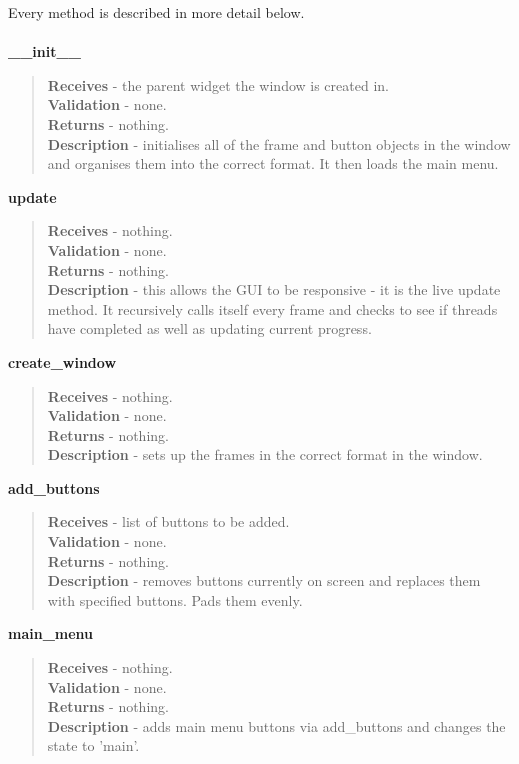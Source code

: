 \documentclass[titlepage]{article}
\begin{document}
Every method is described in more detail below. \\\\

\textbf{\_\_init\_\_}
\begin{quote}
\textbf{Receives} - the parent widget the window is created in. \\
\textbf{Validation} - none.\\
\textbf{Returns} - nothing. \\
\textbf{Description} - initialises all of the frame and button objects in the window and organises them into the correct format. It then loads the main menu.
\end{quote}

\textbf{update}
\begin{quote}
\textbf{Receives} - nothing. \\
\textbf{Validation} - none.\\
\textbf{Returns} - nothing. \\
\textbf{Description} - this allows the GUI to be responsive - it is the live update method. It recursively calls itself every frame and checks to see if threads have completed as well as updating current progress.
\end{quote}

\textbf{create\_window}
\begin{quote}
\textbf{Receives} - nothing. \\
\textbf{Validation} - none.\\
\textbf{Returns} - nothing. \\
\textbf{Description} - sets up the frames in the correct format in the window.
\end{quote}

\textbf{add\_buttons}
\begin{quote}
\textbf{Receives} - list of buttons to be added. \\
\textbf{Validation} - none.\\
\textbf{Returns} - nothing. \\
\textbf{Description} - removes buttons currently on screen and replaces them with specified buttons. Pads them evenly.
\end{quote}

\textbf{main\_menu}
\begin{quote}
\textbf{Receives} - nothing. \\
\textbf{Validation} - none.\\
\textbf{Returns} - nothing. \\
\textbf{Description} - adds main menu buttons via add\_buttons and changes the state to 'main'. 
\end{quote}
\end{document}
